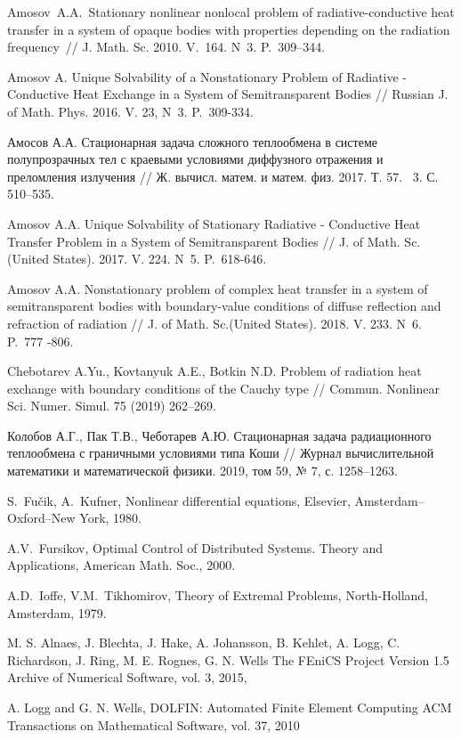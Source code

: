 \documentclass[12pt]{article}
\begin{document}
\begin{thebibliography}{999}
        Amosov~A.A.\ Stationary nonlinear nonlocal problem of
        radiative-conductive heat transfer in a system of opaque bodies
        with properties depending on the radiation frequency~// J\@.
        Math. Sc. 2010. V.~164. N~3. P.~309--344.

        Amosov A. Unique Solvability of a Nonstationary Problem of Radiative - Conductive
        Heat Exchange in a System of Semitransparent Bodies // Russian J. of Math.
        Phys. 2016. V. 23, N~3. P.~309-334.

        Амосов А.А. Стационарная задача сложного теплообмена в системе полупрозрачных тел с
        краевыми условиями диффузного отражения и преломления излучения // Ж.
        вычисл. матем. и матем. физ. 2017. Т. 57. \textnumero~3. С. 510--535.

        Amosov A.A. Unique Solvability of Stationary Radiative - Conductive Heat Transfer
        Problem in a System of Semitransparent Bodies // J. of Math.
        Sc.(United States). 2017. V. 224. N~5. P.~618-646.

        Amosov A.A. Nonstationary problem of complex heat transfer in a system of
        semitransparent bodies with boundary-value conditions of diffuse reflection and refraction
        of radiation // J. of Math. Sc.(United States). 2018. V. 233. N~6. P.~777 -806.

        Chebotarev A.Yu., Kovtanyuk A.E., Botkin N.D\@.
        Problem of radiation heat exchange with boundary conditions of the Cauchy type
        // Commun. Nonlinear Sci. Numer. Simul. 75 (2019) 262--269.

        Колобов А.Г., Пак Т.В., Чеботарев А.Ю.
        Стационарная задача радиационного теплообмена с граничными условиями типа Коши
        // Журнал вычислительной математики и математической физики.
        2019, том 59, № 7, с. 1258--1263.


         S.~Fu\v{c}ik, A.~Kufner, Nonlinear differential equations,
        Elsevier, Amsterdam--Oxford--New York, 1980.

         A.V.~Fursikov, Optimal Control of Distributed
        Systems. Theory and Applications, American Math. Soc., 2000.

         A.D.~Ioffe, V.M.~Tikhomirov, Theory of Extremal
        Problems, North-Holland, Amsterdam, 1979.

         M. S. Alnaes, J. Blechta, J. Hake, A. Johansson,
        B. Kehlet, A. Logg, C. Richardson, J. Ring, M. E. Rognes,  G. N. Wells
        The FEniCS Project Version 1.5
        Archive of Numerical Software, vol. 3, 2015,

         A. Logg and G. N. Wells, DOLFIN: Automated Finite Element Computing
        ACM Transactions on Mathematical Software, vol. 37, 2010


    \end{thebibliography}
\end{document}

